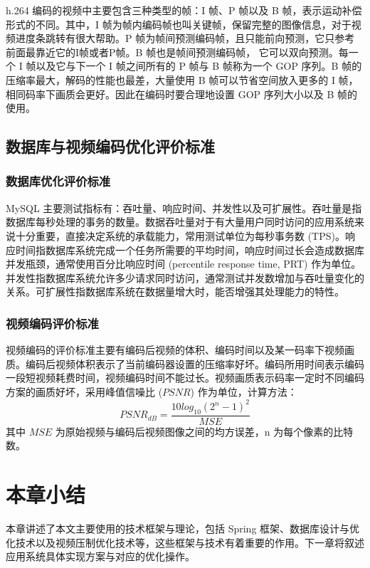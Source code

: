 h.264 编码的视频中主要包含三种类型的帧：I 帧、P 帧以及 B 帧，表示运动补偿形式的不同。其中，I 帧为帧内编码帧也叫关键帧，保留完整的图像信息，对于视频进度条跳转有很大帮助。P 帧为帧间预测编码帧，且只能前向预测，它只参考前面最靠近它的I帧或者P帧。B 帧也是帧间预测编码帧， 它可以双向预测。每一个 I 帧以及它与下一个 I 帧之间所有的 P 帧与 B 帧称为一个 GOP 序列。B 帧的压缩率最大，解码的性能也最差，大量使用 B 帧可以节省空间放入更多的 I 帧，相同码率下画质会更好。因此在编码时要合理地设置 GOP 序列大小以及 B 帧的使用\cite{richardson2004h}。

\subsection{数据库与视频编码优化评价标准}
\subsubsection{数据库优化评价标准}
MySQL 主要测试指标有：吞吐量、响应时间、并发性以及可扩展性。吞吐量是指数据库每秒处理的事务的数量。数据吞吐量对于有大量用户同时访问的应用系统来说十分重要，直接决定系统的承载能力，常用测试单位为每秒事务数 (TPS)。响应时间指数据库系统完成一个任务所需要的平均时间，响应时间过长会造成数据库并发瓶颈，通常使用百分比响应时间 (percentile response time, PRT) 作为单位。并发性指数据库系统允许多少请求同时访问，通常测试并发数增加与吞吐量变化的关系。可扩展性指数据库系统在数据量增大时，能否增强其处理能力的特性\cite{schwartz2012high}。

\subsubsection{视频编码评价标准}

视频编码的评价标准主要有编码后视频的体积、编码时间以及某一码率下视频画质。编码后视频体积表示了当前编码器设置的压缩率好坏。编码所用时间表示编码一段短视频耗费时间，视频编码时间不能过长。视频画质表示码率一定时不同编码方案的画质好坏，采用峰值信噪比 ($PSNR$) 作为单位\cite{毕厚杰2005新一代视频压缩编码标准}，计算方法：
\begin{equation}
\label{eq:forward_back_pre}
PSNR_{dB} = \frac{10log_{10}(2^{n} - 1)^{2}}{MSE}
\end{equation}
其中 $MSE$ 为原始视频与编码后视频图像之间的均方误差，n 为每个像素的比特数。

\section{本章小结}
本章讲述了本文主要使用的技术框架与理论，包括 Spring 框架、数据库设计与优化技术以及视频压制优化技术等，这些框架与技术有着重要的作用。下一章将叙述应用系统具体实现方案与对应的优化操作。







